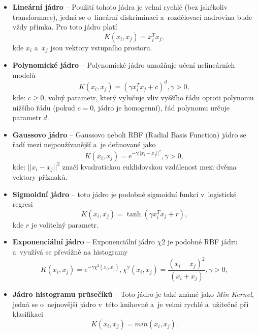 \begin{itemize}
\item\textbf{Lineární jádro} --
Použití tohoto jádra je velmi rychlé (bez jakékoliv transformace), jedná se o~lineární diskriminaci a~rozdělovací nadrovina bude vždy přímka. Pro toto jádro platí 
\begin{equation*}
 \label{linearK}
  K(x_i, x_j) = x_i^T x_j,
\end{equation*}
  kde $x_i$ a~$x_j$ jsou vektory vstupního prostoru.

\item\textbf{Polynomické jádro} --
Polynomické jádro umožňuje učení nelineárních modelů
\begin{equation*}
\label{polyK}
  K(x_i, x_j) = (\gamma x_i^T x_j + c)^{d}, \gamma > 0,
\end{equation*}
kde: $c \geq 0$, volný parametr, který vylučuje vliv vyššího řádu oproti polynomu nižšího řádu (pokud $c = 0$, jádro je homogenní), řád polynomu určuje parametr $d$.

\item\textbf{Gaussovo jádro} --
Gaussovo neboli RBF (Radial Basis Function) jádro se řadí mezi nejpoužívanější a~je definované jako
\begin{equation*}
\label{RBFK}
 K(x_i, x_j) = e^{-\gamma ||x_i - x_j||^2}, \gamma > 0,
\end{equation*}
kde: $||x_i - x_j||^2$ značí kvadratickou euklidovskou vzdálenost mezi dvěma vektory příznaků.

\item\textbf{Sigmoidní jádro} --
toto jádro je podobné sigmoidní funkci v~logistické regresi
\begin{equation*}
\label{sigmK}
 K(x_i, x_j) = \tanh(\gamma x_i^T x_j + r),
\end{equation*}
kde $r$ je volitelný parametr.

\item\textbf{Exponenciální jádro} --
Exponenciální jádro $\chi$2 je podobné RBF jádru a~využívá se převážně na histogramy
\begin{equation*}
\label{expK}
 K(x_i, x_j) = e^{-\gamma \chi^2(x_i,x_j)}, \chi^2(x_i,x_j) = \frac{(x_i-x_j)^2}{(x_i+x_j)}, \gamma > 0,
\end{equation*}

\item\textbf{Jádro histogramu průsečíků} --
Toto jádro je také známé jako \textit{Min Kernel}, jedná se o~nejnovější jádro v~této knihovně a~je velmi rychlé a~užitečné při klasifikaci
\begin{equation*}
\label{innK}
 K(x_i, x_j) = min(x_i,x_j).
\end{equation*}
\end{itemize}

